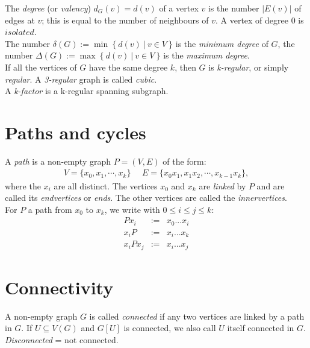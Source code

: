 		The \textit{degree} (or \textit{valency}) $d_G (v) = d(v)$ of a vertex $v$ is the number $|E(v)|$ of edges at $v$; this is equal to the number of neighbours of $v$. A vertex of degree 0 is $isolated$. \\
		
		The number $\delta(G) := \min~ \{~ d(v) ~| ~v \in V ~\}$ is the \textit{minimum degree} of $G$, the number $\Delta(G) := \max ~\{~ d(v) ~|~ v \in V ~\}$ is the \textit{maximum degree}.\\
		
		If all the vertices of $G$ have the same degree $k$, then $G$ is \textit{k-regular}, or simply \textit{regular}. A \textit{3-regular} graph is called \textit{cubic}.\\

                A \textit{k-factor} is a k-regular spanning subgraph.

	\section{Paths and cycles}
		A \textit{path} is a non-empty graph $P = (V, E)$ of the form:
		\begin{eqnarray*}
			V = \{x_0, x_1, \dotsb, x_k \} ~~~~~~ E = \{x_0x_1, x_1x_2, \dotsb, x_{k-1}x_k\},
		\end{eqnarray*}		
		where the $x_i$ are all distinct. The vertices $x_0$ and $x_k$ are \textit{linked} by $P$ and are called its \textit{endvertices} or \textit{ends}. The other vertices are called the \textit{innervertices}.\\
		
		For $P$ a path from $x_0$ to $x_k$, we write with $0 \leq i \leq j \leq k$:
		\begin{eqnarray*}
			Px_i &:=& x_0 ... x_i\\
			x_iP &:=& x_i ... x_k\\
			x_iPx_j &:=& x_i ... x_j
		\end{eqnarray*}
	
	\section{Connectivity}
	A non-empty graph $G$ is called \textit{connected} if any two vertices are linked by a path in $G$. If $U \subseteq V(G)$ and $G[U]$ is connected, we also call $U$ itself connected in $G$.\\

        \textit{Disconnected} = not connected.\\

